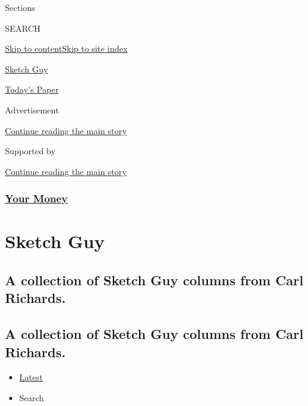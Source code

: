 Sections

SEARCH

\protect\hyperlink{site-content}{Skip to
content}\protect\hyperlink{site-index}{Skip to site index}

\href{https://www.nytimes3xbfgragh.onion/column/sketch-guy}{Sketch Guy}

\href{https://myaccount.nytimes3xbfgragh.onion/auth/login?response_type=cookie\&client_id=vi}{}

\href{https://www.nytimes3xbfgragh.onion/section/todayspaper}{Today's
Paper}

Advertisement

\protect\hyperlink{after-top}{Continue reading the main story}

Supported by

\protect\hyperlink{after-sponsor}{Continue reading the main story}

\hypertarget{your-money}{%
\subsubsection{\texorpdfstring{\href{/section/your-money}{Your
Money}}{Your Money}}\label{your-money}}

\hypertarget{sketch-guy}{%
\section{Sketch Guy}\label{sketch-guy}}

\hypertarget{a-collection-of-sketch-guy-columns-from-carl-richards}{%
\subsection{A collection of Sketch Guy columns from Carl
Richards.}\label{a-collection-of-sketch-guy-columns-from-carl-richards}}

\hypertarget{a-collection-of-sketch-guy-columns-from-carl-richards-1}{%
\subsection{A collection of Sketch Guy columns from Carl
Richards.}\label{a-collection-of-sketch-guy-columns-from-carl-richards-1}}

\begin{itemize}
\tightlist
\item
  \protect\hyperlink{stream-panel}{Latest}
\item
  Search
\end{itemize}

